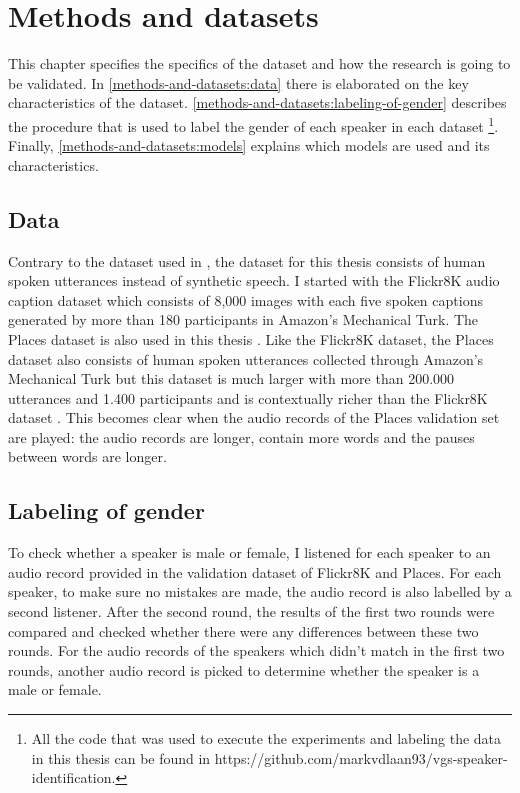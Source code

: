\documentclass[a4paper, oneside]{book}
\begin{document}
\chapter{Methods and datasets}\label{chapter:methods-and-datasets}

This chapter specifies the specifics of the dataset and how the research is going to be validated. In \autoref{methods-and-datasets:data} there is elaborated on the key characteristics of the dataset. \autoref{methods-and-datasets:labeling-of-gender} describes the procedure that is used to label the gender of each speaker in each dataset \footnote{All the code that was used to execute the experiments and labeling the data in this thesis can be found in https://github.com/markvdlaan93/vgs-speaker-identification.}. Finally, \autoref{methods-and-datasets:models} explains which models are used and its characteristics.

\section{Data}\label{methods-and-datasets:data}

Contrary to the dataset used in \cite{AlishahiBC17}, the dataset for this thesis consists of human spoken utterances instead of synthetic speech. I started with the Flickr8K audio caption dataset \cite{HarwathG15, hodosh2013framing} which consists of 8,000 images with each five spoken captions generated by more than 180 participants in Amazon's Mechanical Turk. The Places dataset is also used in this thesis \cite{Zhou2014}. Like the Flickr8K dataset, the Places dataset also consists of human spoken utterances collected through Amazon’s Mechanical Turk but this dataset is much larger with more than 200.000 utterances and 1.400 participants and is contextually richer than the Flickr8K dataset \cite{Harwath2017LW}. This becomes clear when the audio records of the Places validation set are played: the audio records are longer, contain more words and the pauses between words are longer. \\

\section{Labeling of gender}\label{methods-and-datasets:labeling-of-gender}

To check whether a speaker is male or female, I listened for each speaker to an audio record provided in the validation dataset of Flickr8K and Places. For each speaker, to make sure no mistakes are made, the audio record is also labelled by a second listener. After the second round, the results of the first two rounds were compared and checked whether there were any differences between these two rounds. For the audio records of the speakers which didn't match in the first two rounds, another audio record is picked to determine whether the speaker is a male or female. \\ 
\end{document}
